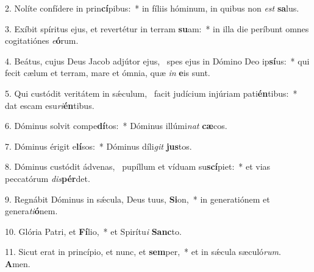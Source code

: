 2. Nolíte confídere in prin\textbf{cí}pibus:~*  in fíliis hóminum, in quibus non \textit{est} \textbf{sa}lus.\

3. Exíbit spíritus ejus, et revertétur in terram \textbf{su}am:~*  in illa die períbunt omnes cogitatiónes \textit{e}\textbf{ó}rum.\

4. Beátus, cujus Deus Jacob adjútor ejus, \dag\  spes ejus in Dómino Deo ip\textbf{sí}us:~*  qui fecit cælum et terram, mare et ómnia, quæ \textit{in} \textbf{e}is sunt.\

5. Qui custódit veritátem in sǽculum, \dag\  facit judícium injúriam pati\textbf{én}tibus:~*  dat escam esu\textit{ri}\textbf{én}tibus.\

6. Dóminus solvit compe\textbf{dí}tos:~*  Dóminus illúmi\textit{nat} \textbf{cæ}cos.\

7. Dóminus érigit e\textbf{lí}sos:~*  Dóminus díli\textit{git} \textbf{jus}tos.\

8. Dóminus custódit ádvenas, \dag\  pupíllum et víduam su\textbf{scí}piet:~*  et vias peccatórum \textit{dis}\textbf{pér}det.\

9. Regnábit Dóminus in sǽcula, Deus tuus, \textbf{Si}on,~*  in generatiónem et genera\textit{ti}\textbf{ó}nem.\

10. Glória Patri, et \textbf{Fí}lio,~*  et Spirítu\textit{i} \textbf{Sanc}to.\

11. Sicut erat in princípio, et nunc, et \textbf{sem}per,~*  et in sǽcula sæculó\textit{rum}. \textbf{A}men.\

